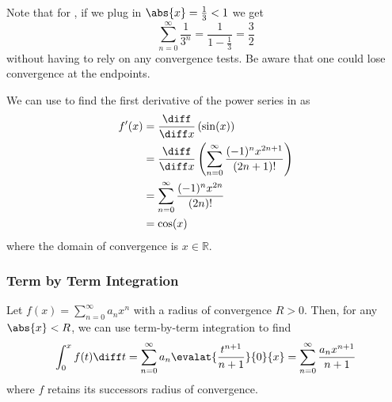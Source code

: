 \begin{rem}\label{rem-term-by-term-differentiation}
	Note that for , if we
	plug in $\abs{x}=\tfrac{1}{3}<1$ we get
	\begin{equation*}
		\sum_{n=0}^\infty \frac{1}{3^n} = \frac{1}{1-\frac{1}{3}} = \frac{3}{2}
	\end{equation*}
	without having to rely on any convergence tests. Be aware that one could lose
	convergence at the endpoints.
\end{rem}

\begin{exm}\label{exm-term-by-term-differentiation:2}
	We can use  to find the first
	derivative of the power series in  as
	\begin{align*}
		f'(x) & = \frac{\diff}{\diff x}\left(\sin(x)\right)                                           \\
		      & = \frac{\diff}{\diff x}\left(\sum_{n=0}^\infty \frac{(-1)^n x^{2n+1}}{(2n+1)!}\right) \\
		      & = \sum_{n=0}^\infty \frac{(-1)^n x^{2n}}{(2n)!}                                       \\
		      & = \cos(x)
	\end{align*}
	where the domain of convergence is $x\in\mathbb{R}$.
\end{exm}

\subsubsection{Term by Term Integration}\label{subsubsec-term-by-term-integration}

\begin{thm}\label{thm-term-by-term-integration}
	Let $f(x)=\sum_{n=0}^\infty a_n x^n$ with a radius of convergence $R>0$. Then,
	for any $\abs{x}<R$, we can use term-by-term integration to find
	\begin{equation}\label{eq-term-by-term-integration}
		\int_0^x f(t) \diff t = \sum_{n=0}^\infty a_n \evalat{\frac{t^{n+1}}{n+1}}{0}{x} = \sum_{n=0}^\infty \frac{a_n x^{n+1}}{n+1}
	\end{equation}
	where $f$ retains its successors radius of convergence.
\end{thm}

